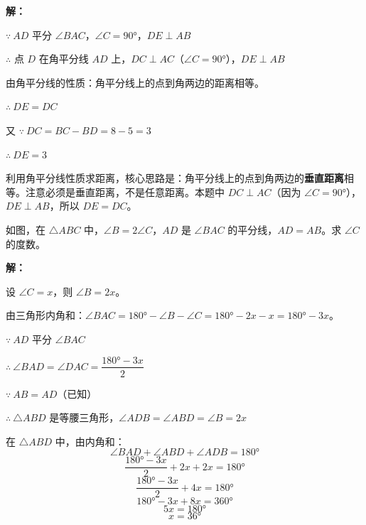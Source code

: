 \documentclass[12pt, a4paper]{ctexart}
\begin{document}
\textbf{解：}

$\because\ AD$ 平分 $\angle BAC$，$\angle C = 90°$，$DE \perp AB$

$\therefore$ 点 $D$ 在角平分线 $AD$ 上，$DC \perp AC$（$\angle C = 90°$），$DE \perp AB$

由角平分线的性质：角平分线上的点到角两边的距离相等。

$\therefore\ DE = DC$

又 $\because\ DC = BC - BD = 8 - 5 = 3$

$\therefore\ DE = 3$

\begin{tipbox}[方法总结]
利用角平分线性质求距离，核心思路是：角平分线上的点到角两边的\textbf{垂直距离}相等。注意必须是垂直距离，不是任意距离。本题中 $DC \perp AC$（因为 $\angle C = 90°$），$DE \perp AB$，所以 $DE = DC$。
\end{tipbox}

\begin{examplebox}[【例题8】与第11章交叉的综合题]
如图，在 $\triangle ABC$ 中，$\angle B = 2\angle C$，$AD$ 是 $\angle BAC$ 的平分线，$AD = AB$。求 $\angle C$ 的度数。

\begin{center}
\end{center}
\end{examplebox}

\textbf{解：}

设 $\angle C = x$，则 $\angle B = 2x$。

由三角形内角和：$\angle BAC = 180° - \angle B - \angle C = 180° - 2x - x = 180° - 3x$。

$\because\ AD$ 平分 $\angle BAC$

$\therefore\ \angle BAD = \angle DAC = \dfrac{180° - 3x}{2}$

$\because\ AB = AD$（已知）

$\therefore\ \triangle ABD$ 是等腰三角形，$\angle ADB = \angle ABD = \angle B = 2x$

在 $\triangle ABD$ 中，由内角和：
\[
\angle BAD + \angle ABD + \angle ADB = 180°
\]
\[
\frac{180° - 3x}{2} + 2x + 2x = 180°
\]
\[
\frac{180° - 3x}{2} + 4x = 180°
\]
\[
180° - 3x + 8x = 360°
\]
\[
5x = 180°
\]
\[
x = 36°
\]
\end{document}
